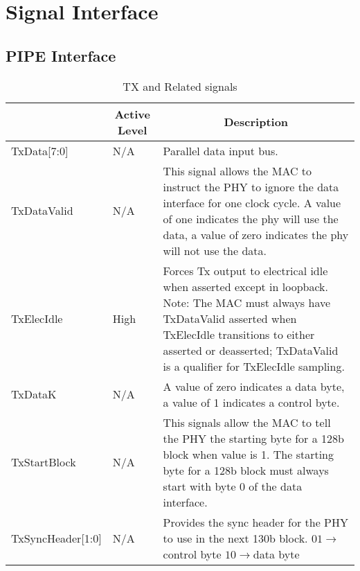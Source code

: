 
\chapter{Signal Interface}
\clearpage
\section{PIPE Interface}

\label{sec:1}
\begin{table}[H]
    \caption{TX and Related signals}
    \label{tab:p1}
    \centering
  \begin{tabular}{ |m{26mm}|m{10mm}|m{60mm}|  }
\hline
\rowcolor{Gray}
\multicolumn{1}{|c|}{\textbf{Name} } 
& \multicolumn{1}{|c|}{\textbf{Active Level}} 
& \multicolumn{1}{|c|}{\textbf{Description}}\\
\hline
TxData[7:0] 
& 
N/A
&
Parallel data input bus. \\
\hline

TxDataValid
& 
N/A
&
This signal allows the MAC to instruct the PHY to ignore the data interface \newline
for one clock cycle. A value of one \newline
indicates the phy will use the data, a \newline
value of zero indicates the phy will not \newline
use the data. \\
\hline

TxElecIdle
& 
High
&
Forces Tx output to electrical idle when asserted
except in loopback.\newline \newline
Note: The MAC must always have TxDataValid
asserted when TxElecIdle transitions to either
asserted or deasserted; TxDataValid is a qualifier
for TxElecIdle sampling.
\\
\hline


TxDataK
& 
N/A
&
A value of zero indicates a
data byte, a value of 1 indicates a
control byte.\\
\hline


TxStartBlock
& 
N/A
&
This signals allow the MAC to tell
the PHY the starting byte for a 128b
block when value is 1. The starting byte for a 128b
block must always start with byte 0 of
the data interface. \\
\hline



TxSyncHeader[1:0]
& 
N/A
&

Provides the sync header for
the PHY to use in the next 130b block.
\newline \newline
$ 01 \longrightarrow $control byte \newline
$ 10 \longrightarrow $data byte


\end{tabular}
\end{table}
